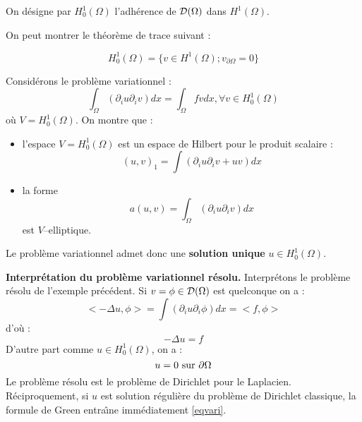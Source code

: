 \documentclass[12pt]{book}
\begin{document}
\begin{defn}
On d\'esigne par $H_0^1(\Omega)$ l'adh\'erence de ${\cal D}(\Omega)$
dans $H^1(\Omega)$.
\end{defn}
On peut montrer le th\'eor\`eme de trace suivant :
\begin{thm}
\begin{equation}
H_0^1(\Omega)=\{v\in H^1(\Omega); v_{\partial \Omega}=0\}
\end{equation}
\end{thm}
\begin{exmp} 
Consid\'erons le probl\`eme variationnel :
\begin{equation}
\int_\Omega (\partial_i u\partial_i v)dx=\int_\Omega fvdx, \forall v
\in H^1_0(\Omega)
\end{equation}
o\`u $V=H_0^1(\Omega)$.
On montre que :
\begin{itemize}
\item l'espace $V=H_0^1(\Omega)$ est un espace de Hilbert pour le produit
scalaire :
\begin{equation}
(u,v)_1=\int(\partial_i u\partial_i v+uv)dx
\end{equation}
\item la forme
\begin{equation}\label{eqvari}
a(u,v)=\int_\Omega (\partial_i u\partial_i v)dx
\end{equation}
est $V$--elliptique.
\end{itemize}
Le probl\`eme variationnel 
admet donc une {\bf solution unique} $u\in H^1_0(\Omega)$.
\end{exmp}
\begin{exmp}
{\bf Interpr\'etation du probl\`eme variationnel r\'esolu.}
Interpr\'etons le probl\`eme r\'esolu de l'exemple pr\'ec\'edent.
Si $v=\phi\in {\cal D}(\Omega)$ est quelconque on a :
\begin{equation}
<-\Delta u,\phi>=\int(\partial_i u\partial_i \phi)dx=<f,\phi>
\end{equation}
d'o\`u :
\begin{equation}
-\Delta u=f
\end{equation}
D'autre part comme $u\in H^1_0(\Omega)$, on a :
\begin{equation}
u=0\ {\rm sur}\ \partial\Omega
\end{equation}
Le probl\`eme r\'esolu est le probl\`eme de Dirichlet pour le Laplacien.
R\'eciproquement, si $u$ est solution r\'eguli\`ere du probl\`eme de
Dirichlet classique, la formule de Green entra\^\i ne imm\'ediatement
\ref{eqvari}.
\end{exmp}
\end{document}
